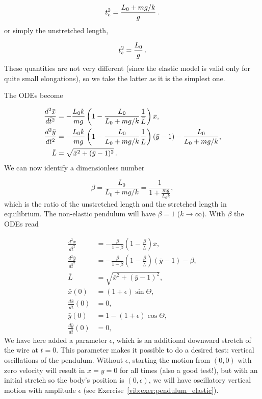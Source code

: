 \documentclass[%
oneside,                 %
final,                   %
10pt]{article}
\begin{document}
\[ t_c^2 = \frac{L_0+mg/k}{g}\tp\]
or simply the unstretched length,

\[ t_c^2 = \frac{L_0}{g}\tp\]
These quantities are not very different (since the elastic model
is valid only for quite small elongations), so we take the latter as it is
the simplest one.

The ODEs become

\begin{align*}
\frac{d^2\bar x}{d\bar t^2} &=
-\frac{L_0k}{mg}\left(1 -\frac{L_0}{L_0+mg/k}\frac{1}{\bar L}\right)\bar x,\\ 
\frac{d^2\bar y}{d\bar t^2} &=
-\frac{L_0k}{mg}\left(1 -\frac{L_0}{L_0+mg/k}\frac{1}{\bar L}\right)(\bar y-1)
-\frac{L_0}{L_0 + mg/k},\\ 
\bar L &= \sqrt{\bar x^2 + (\bar y-1)^2}\tp
\end{align*}
We can now identify a dimensionless number

\[ \beta = \frac{L_0}{L_0 + mg/k} = \frac{1}{1+\frac{mg}{L_0k}},\]
which is the ratio of the unstretched length and the
stretched length in equilibrium. The non-elastic pendulum will have
$\beta =1$ ($k\rightarrow\infty$).
With $\beta$ the ODEs read

\begin{align}
\frac{d^2\bar x}{d\bar t^2} &=
-\frac{\beta}{1-\beta}\left(1- \frac{\beta}{\bar L}\right)\bar x,
\label{vib:app:pendulum_elastic:x:s}\\ 
\frac{d^2\bar y}{d\bar t^2} &=
-\frac{\beta}{1-\beta}\left(1- \frac{\beta}{\bar L}\right)(\bar y-1)
-\beta,
\label{vib:app:pendulum_elastic:y:s}\\ 
\bar L &= \sqrt{\bar x^2 + (\bar y-1)^2},
\label{vib:app:pendulum_elastic:L:s}\\ 
\bar x(0) &= (1+\epsilon)\sin\Theta,
\label{vib:app:pendulum_elastic:x0:s}\\ 
\frac{d\bar x}{d\bar t}(0) &= 0,
\label{vib:app:pendulum_elastic:vx0:s}\\ 
\bar y(0) &= 1 - (1+\epsilon)\cos\Theta,
\label{vib:app:pendulum_elastic:y0:s}\\ 
\frac{d\bar y}{d\bar t}(0) &= 0,
\label{vib:app:pendulum_elastic:vy0:s}
\end{align}
We have here added a parameter $\epsilon$, which is an additional
downward stretch of the wire at $t=0$. This parameter makes it possible
to do a desired test: vertical oscillations of the pendulum. Without
$\epsilon$, starting the motion from $(0,0)$ with zero velocity will
result in $x=y=0$ for all times (also a good test!), but with
an initial stretch so the body's position is $(0,\epsilon)$, we
will have oscillatory vertical motion with amplitude $\epsilon$ (see
Exercise~\ref{vib:exer:pendulum_elastic}).
\end{document}
